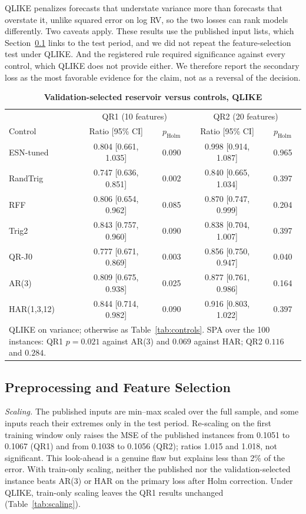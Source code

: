\documentclass{ieeeaccess}
\begin{document}
QLIKE penalizes forecasts that understate variance more than forecasts that overstate it, unlike squared error on log RV, so the two losses can rank models differently. Two caveats apply. These results use the published input lists, which Section~\ref{sec:res-features} links to the test period, and we did not repeat the feature-selection test under QLIKE. And the registered rule required significance against every control, which QLIKE does not provide either. We therefore report the secondary loss as the most favorable evidence for the claim, not as a reversal of the decision.

\begin{table}[t]
\caption{\textbf{Validation-selected reservoir versus controls, QLIKE}}
\label{tab:qlike}
\setlength{\tabcolsep}{2.5pt}
\begin{tabular}{|l|c|c|c|c|}
\hline
& \multicolumn{2}{c|}{QR1 (10 features)} & \multicolumn{2}{c|}{QR2 (20 features)}\\
Control & Ratio [95\% CI] & $p_\mathrm{Holm}$ & Ratio [95\% CI] & $p_\mathrm{Holm}$\\
\hline
ESN-tuned & 0.804 [0.661, 1.035] & 0.090 & 0.998 [0.914, 1.087] & 0.965\\
RandTrig & 0.747 [0.636, 0.851] & 0.002 & 0.840 [0.665, 1.034] & 0.397\\
RFF & 0.806 [0.654, 0.962] & 0.085 & 0.870 [0.747, 0.999] & 0.204\\
Trig2 & 0.843 [0.757, 0.960] & 0.090 & 0.838 [0.704, 1.007] & 0.397\\
QR-J0 & 0.777 [0.671, 0.869] & 0.003 & 0.856 [0.750, 0.947] & 0.040\\
AR(3) & 0.809 [0.675, 0.938] & 0.025 & 0.877 [0.761, 0.986] & 0.164\\
HAR(1,3,12) & 0.844 [0.714, 0.982] & 0.090 & 0.916 [0.803, 1.022] & 0.397\\
\hline
\multicolumn{5}{p{240pt}}{QLIKE on variance; otherwise as Table~\ref{tab:controls}. SPA over the 100 instances: QR1 $p=0.021$ against AR(3) and $0.069$ against HAR; QR2 $0.116$ and $0.284$.}\\
\end{tabular}
\end{table}

\subsection{Preprocessing and Feature Selection}
\label{sec:res-features}
\emph{Scaling.} The published inputs are min--max scaled over the full sample, and some inputs reach their extremes only in the test period. Re-scaling on the first training window only raises the MSE of the published instances from 0.1051 to 0.1067 (QR1) and from 0.1038 to 0.1056 (QR2); ratios 1.015 and 1.018, not significant. This look-ahead is a genuine flaw but explains less than 2\% of the error. With train-only scaling, neither the published nor the validation-selected instance beats AR(3) or HAR on the primary loss after Holm correction. Under QLIKE, train-only scaling leaves the QR1 results unchanged (Table~\ref{tab:scaling}).
\end{document}
